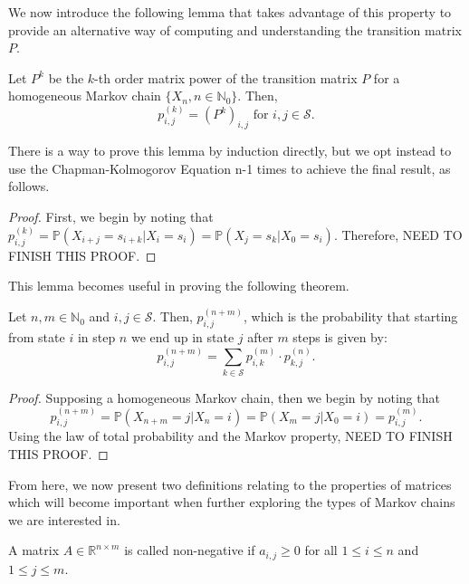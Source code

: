 We now introduce the following lemma that takes advantage of this property to provide an alternative way of computing and understanding the transition matrix $P$. 

\begin{lemma}
	Let $P^k$ be the $k$-th order matrix power of the transition matrix $P$ for a homogeneous Markov chain $\{ X_n, n \in \mathbb{N}_0 \}$. Then, 
	\[ p_{i,j}^{(k)} = (P^k)_{i,j} \text{ for } i,j \in \mathcal{S}. \]
\end{lemma}

There is a way to prove this lemma by induction directly, but we opt instead to use the Chapman-Kolmogorov Equation n-1 times to achieve the final result, as follows. 

\begin{proof}
	First, we begin by noting that $p_{i,j}^{(k)} = \mathbb{P}(X_{i+j} = s_{i + k} | X_i = s_i) = \mathbb{P}(X_{j} = s_{k} | X_0 = s_i)$. Therefore, NEED TO FINISH THIS PROOF. 
	
\end{proof}

This lemma becomes useful in proving the following theorem. 

\begin{theorem}
	Let $n,m \in \mathbb{N}_0$ and $i,j \in \mathcal{S}$. Then, $p_{i,j}^{(n+m)}$, which is the probability that starting from state $i$ in step $n$ we end up in state $j$ after $m$ steps is given by: 
	\[ p_{i,j}^{(n+m)} = \sum_{k \in \mathcal{S}} p_{i,k}^{(m)} \cdot p_{k,j}^{(n)}. \]
\end{theorem}

\begin{proof}
	Supposing a homogeneous Markov chain, then we begin by noting that 
	\[ p_{i,j}^{(n+m)} = \mathbb{P}(X_{n+m} = j | X_n = i) = \mathbb{P}(X_m = j | X_0 = i) = p_{i,j}^{(m)}. \] 
	Using the law of total probability and the Markov property, NEED TO FINISH THIS PROOF.
\end{proof}

From here, we now present two definitions relating to the properties of matrices which will become important when further exploring the types of Markov chains we are interested in. 

\begin{definition}
	A matrix $A \in \mathbb{R}^{n \times m}$ is called non-negative if $a_{i,j} \geq 0$ for all $1 \leq i \leq n$ and $1 \leq j \leq m$. 
\end{definition}

